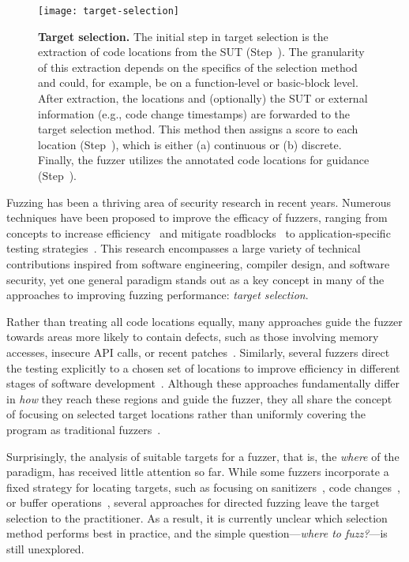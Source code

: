 \begin{figure*}[t!]
	\centering
	\texttt{[image: target-selection]}
	\vspace*{1em}
	\caption{\textbf{Target selection.} \normalfont The initial step in target selection is the extraction of code locations from the SUT (Step~\stepone). The granularity of this extraction depends on the specifics of the selection method and could, for example, be on a function-level or basic-block level. After extraction, the locations and (optionally) the SUT or external information (e.g., code change timestamps) are forwarded to the target selection method. This method then assigns a score to each location (Step~\steptwo), which is either (a) continuous or (b) discrete. Finally, the fuzzer utilizes the annotated code locations for guidance (Step~\stepthree).}
	\label{fig:target-selection}
\end{figure*}

Fuzzing has been a thriving area of security research in recent years. Numerous techniques have been proposed to improve the efficacy of fuzzers, ranging from concepts to increase efficiency~\citep{CheChe18, AscSchBlaGaw+19, ShePeiEpsYan+19, SeiMaiMue23} and mitigate roadblocks~\citep{BlaAscSchAbb+19, BarSchSchSch+23} to application-specific testing strategies~\citep{CheDiaZhaZuo+18, SchChlSchBar+23, RawJaiKumCoj+17}. This research encompasses a large variety of technical contributions inspired from software engineering, compiler design, and software security, yet one general paradigm stands out as a key concept in many of the approaches to improving fuzzing performance: \emph{target selection}.

Rather than treating all code locations equally, many approaches guide the fuzzer towards areas more likely to contain defects, such as those involving memory accesses, insecure API calls, or recent patches~\citep[]{OstRazBosGiu+20,HalSloNeuBos+13, MarCad+13}. Similarly, several fuzzers direct the testing explicitly to a chosen set of locations to improve efficiency in different stages of software development~\cite[][]{BöhPhaNguRoy+17, CheXueLiChe+18, HuaGuoShiYao+22}. Although these approaches fundamentally differ in \emph{how} they reach these regions and guide the fuzzer, they all share the concept of focusing on selected target locations rather than uniformly covering the program as traditional fuzzers~\citep{SutGreAmi07}.

Surprisingly, the analysis of suitable targets for a fuzzer, that is, the \emph{where} of the paradigm, has received little attention so far. While some fuzzers incorporate a fixed strategy for locating targets, such as focusing on sanitizers~\citep{OstRazBosGiu+20}, code changes~\citep{MarCad+13}, or buffer operations~\citep{HalSloNeuBos+13}, several approaches for directed fuzzing leave the target selection to the practitioner. As a result, it is currently unclear which selection method performs best in practice, and the simple question---\emph{where to fuzz?}---is still unexplored.

